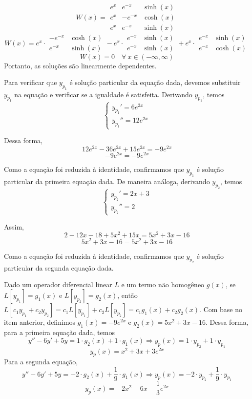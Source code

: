 \documentclass[oneside,12pt,a4paper]{report}
\begin{document}
\begin{resolucao}
    \itemresolucao 
    \[W(x)=\begin{array}{|ccc|}
        e^x & e^{-x} & \sinh(x)\\
        e^x & -e^{-x} & \cosh(x)\\
        e^x & e^{-x} & \sinh(x)
    \end{array}\]
    \[W(x)=e^x\cdot
    \begin{array}{|cc|}
        -e^{-x} & \cosh(x)\\
        e^{-x} & \sinh(x)
    \end{array}
    -
    e^x\cdot
    \begin{array}{|cc|}
        e^{-x} & \sinh(x)\\
        e^{-x} & \sinh(x)
    \end{array}
    +
    e^x\cdot
    \begin{array}{|cc|}
        e^{-x} & \sinh(x)\\
        e^{-x} & \cosh(x)
    \end{array}
    \]
    \[W(x)=0\quad\forall~x\in(-\infty, \infty)\]
    Portanto, as soluções são linearmente dependentes.
\end{resolucao}

\begin{resolucao}
    \itemresolucao Para verificar que $y_{p_1}$ é solução particular da equação dada, devemos substituir $y_{p_1}$ na equação e verificar se a igualdade é satisfeita. Derivando $y_{p_1}$, temos
    \[\begin{cases}
        y_{p_1}'=6e^{2x}\\
        y_{p_1}''=12e^{2x}
    \end{cases}\]

    Dessa forma,
    \[12e^{2x}-36e^{2x}+15e^{2x}=-9e^{2x}\]
    \[\boxed{-9e^{2x}=-9e^{2x}}\]

    Como a equação foi reduzida à identidade, confirmamos que $y_{p_1}$ é solução particular da primeira equação dada. De maneira análoga, derivando $y_{p_2}$, temos
    \[\begin{cases}
        y_{p_2}'=2x+3\\
        y_{p_2}''=2
    \end{cases}\]

    Assim,
    \[2-12x-18+5x^2+15x=5x^2+3x-16\]
    \[\boxed{5x^2+3x-16=5x^2+3x-16}\]

    Como a equação foi reduzida à identidade, confirmamos que $y_{p_2}$ é solução particular da segunda equação dada.

    \itemresolucao Dado um operador diferencial linear $L$ e um termo não homogêneo $g(x)$, se $L[y_{p_1}]=g_1(x)$ e $L[y_{p_2}]=g_2(x)$, então $L[c_1y_{p_1}+c_2y_{p_2}]=c_1L[y_{p_1}]+c_2L[y_{p_2}]=c_1g_1(x)+c_2g_2(x)$. Com base no item anterior, definimos $g_1(x)=-9e^{2x}$ e $g_2(x)=5x^2+3x-16$. Dessa forma, para a primeira equação dada, temos
    \[y''-6y'+5y=1 \cdot g_2(x) + 1 \cdot g_1(x)\Rightarrow y_p(x)=1\cdot y_{p_2}+1\cdot y_{p_1}\]
    \[\boxed{y_p(x)=x^2+3x+3e^{2x}}\]
    Para a segunda equação,
    \[y''-6y'+5y=-2 \cdot g_2(x) + \frac{1}{9} \cdot g_1(x)\Rightarrow y_p(x)=-2\cdot y_{p_2}+\frac{1}{9}\cdot y_{p_1}\]
    \[\boxed{y_p(x)=-2x^2-6x-\frac{1}{3}e^{2x}}\]
\end{resolucao}
\end{document}
